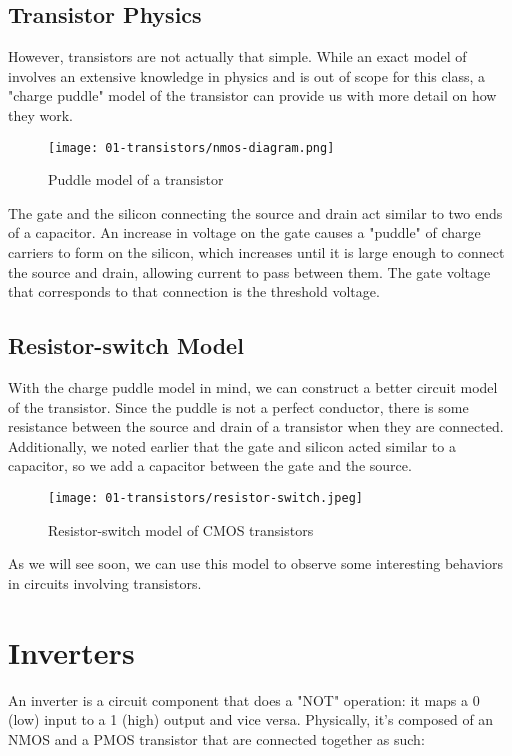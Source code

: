 \documentclass[11pt]{article}
\begin{document}
\subsection{Transistor Physics}

However, transistors are not actually that simple. While an exact model of involves an extensive knowledge in physics and is out of scope for this class, a "charge puddle" model of the transistor can provide us with more detail on how they work.

\begin{figure}[H]
    \centering
        \texttt{[image: 01-transistors/nmos-diagram.png]}
    \caption{Puddle model of a transistor}
\end{figure}

The gate and the silicon connecting the source and drain act similar to two ends of a capacitor. An increase in voltage on the gate causes a "puddle" of charge carriers to form on the silicon, which increases until it is large enough to connect the source and drain, allowing current to pass between them. The gate voltage that corresponds to that connection is the threshold voltage. 

\subsection{Resistor-switch Model}

With the charge puddle model in mind, we can construct a better circuit model of the transistor. Since the puddle is not a perfect conductor, there is some resistance between the source and drain of a transistor when they are connected. Additionally, we noted earlier that the gate and silicon acted similar to a capacitor, so we add a capacitor between the gate and the source. 

\begin{figure}[H]
    \centering
        \texttt{[image: 01-transistors/resistor-switch.jpeg]}
    \caption{Resistor-switch model of CMOS transistors}
\end{figure}

As we will see soon, we can use this model to observe some interesting behaviors in circuits involving transistors.

\newpage
\section{Inverters}

An inverter is a circuit component that does a "NOT" operation: it maps a 0 (low) input to a 1 (high) output and vice versa. Physically, it's composed of an NMOS and a PMOS transistor that are connected together as such:
\end{document}
